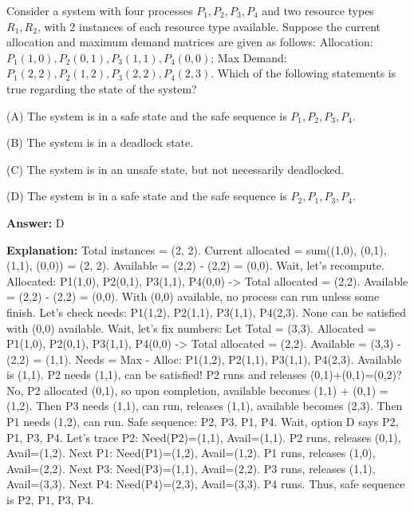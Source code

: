 \begin{tcolorbox}[enhanced,breakable,colback=boxgray,colframe=gray!45,boxrule=0.4pt,arc=2pt,left=6pt,right=6pt,top=4pt,bottom=4pt,title={Q.1},fonttitle=\bfseries\small,coltitle=black,colbacktitle=gray!15]
\small Consider a system with four processes $P_1, P_2, P_3, P_4$ and two resource types $R_1, R_2$, with 2 instances of each resource type available. Suppose the current allocation and maximum demand matrices are given as follows: Allocation: $P_1(1,0), P_2(0,1), P_3(1,1), P_4(0,0)$; Max Demand: $P_1(2,2), P_2(1,2), P_3(2,2), P_4(2,3)$. Which of the following statements is true regarding the state of the system?\par\par\hspace*{1em}(A) The system is in a safe state and the safe sequence is $P_1, P_2, P_3, P_4$.\par\hspace*{1em}(B) The system is in a deadlock state.\par\hspace*{1em}(C) The system is in an unsafe state, but not necessarily deadlocked.\par\hspace*{1em}(D) The system is in a safe state and the safe sequence is $P_2, P_1, P_3, P_4$.\par{}\par\smallskip\textbf{Answer:} D\par\par\textbf{Explanation:} Total instances = (2, 2). Current allocated = sum((1,0), (0,1), (1,1), (0,0)) = (2, 2). Available = (2,2) - (2,2) = (0,0). Wait, let's recompute. Allocated: P1(1,0), P2(0,1), P3(1,1), P4(0,0) -\textgreater{} Total allocated = (2,2). Available = (2,2) - (2,2) = (0,0). With (0,0) available, no process can run unless some finish. Let's check needs: P1(1,2), P2(1,1), P3(1,1), P4(2,3). None can be satisfied with (0,0) available. Wait, let's fix numbers: Let Total = (3,3). Allocated = P1(1,0), P2(0,1), P3(1,1), P4(0,0) -\textgreater{} Total allocated = (2,2). Available = (3,3) - (2,2) = (1,1). Needs = Max - Alloc: P1(1,2), P2(1,1), P3(1,1), P4(2,3). Available is (1,1). P2 needs (1,1), can be satisfied! P2 runs and releases (0,1)+(0,1)=(0,2)? No, P2 allocated (0,1), so upon completion, available becomes (1,1) + (0,1) = (1,2). Then P3 needs (1,1), can run, releases (1,1), available becomes (2,3). Then P1 needs (1,2), can run. Safe sequence: P2, P3, P1, P4. Wait, option D says P2, P1, P3, P4. Let's trace P2: Need(P2)=(1,1), Avail=(1,1). P2 runs, releases (0,1), Avail=(1,2). Next P1: Need(P1)=(1,2), Avail=(1,2). P1 runs, releases (1,0), Avail=(2,2). Next P3: Need(P3)=(1,1), Avail=(2,2). P3 runs, releases (1,1), Avail=(3,3). Next P4: Need(P4)=(2,3), Avail=(3,3). P4 runs. Thus, safe sequence is P2, P1, P3, P4.\par
\end{tcolorbox}


